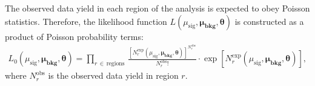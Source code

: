 The observed data yield in each region of the analysis is expected to obey Poisson statistics.
Therefore, the likelihood function $L(\mu_{\text{sig}}, \bm{\mu_{\text{bkg}}}, \bm{\theta})$ is
constructed as a product of Poisson probability terms:
\begin{align}
    L_0(\mu_{\text{sig}}, \bm{\mu_{\text{bkg}}}, \bm{\theta}) = \prod\limits_{r\,\in\,\text{regions}} \, 
            \frac
            {
                \left[N_r^{\text{exp}} ( \mu_{\text{sig}}, \bm{\mu_{\text{bkg}}}, \bm{\theta}) \right] ^ {N_r^{\text{obs}}}
            }
            {
                N_r^{\text{obs}}!
            }
            \cdot
            \exp\left[ N_r^{\text{exp}} ( \mu_{\text{sig}}, \bm{\mu_{\text{bkg}}}, \bm{\theta}) \right],
    \label{eq:likelihood_main}
\end{align}
where $N_r^{\text{obs}}$ is the observed data yield in region $r$.

